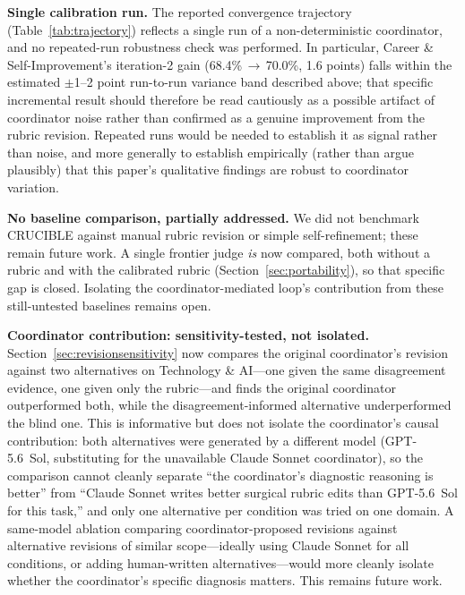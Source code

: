 \documentclass[11pt]{article}
\begin{document}
\textbf{Single calibration run.} The reported convergence trajectory
(Table~\ref{tab:trajectory}) reflects a single run of a non-deterministic
coordinator, and no repeated-run robustness check was performed. In particular, Career \& Self-Improvement's iteration-2 gain
(68.4\%\,$\to$\,70.0\%, 1.6 points) falls within the estimated $\pm$1--2 point
run-to-run variance band described above; that specific
incremental result should therefore be read cautiously as a possible
artifact of coordinator noise rather than confirmed as a genuine
improvement from the rubric revision. Repeated runs would be needed to
establish it as signal rather than noise, and more generally to establish
empirically (rather than argue plausibly) that this paper's qualitative
findings are robust to coordinator variation.

\textbf{No baseline comparison, partially addressed.} We did not benchmark
CRUCIBLE against manual rubric revision or simple self-refinement; these
remain future work. A single frontier judge \emph{is} now compared, both
without a rubric and with the calibrated rubric
(Section~\ref{sec:portability}), so that specific gap is closed. Isolating
the coordinator-mediated loop's contribution from these still-untested
baselines remains open.

\textbf{Coordinator contribution: sensitivity-tested, not isolated.}
Section~\ref{sec:revisionsensitivity} now compares the original coordinator's
revision against two alternatives on Technology \& AI---one given the same
disagreement evidence, one given only the rubric---and finds the original
coordinator outperformed both, while the disagreement-informed alternative
underperformed the blind one. This is informative but does not isolate the
coordinator's causal contribution: both alternatives were generated by a
different model (GPT-5.6~Sol, substituting for the unavailable Claude
Sonnet coordinator), so the comparison cannot cleanly separate ``the
coordinator's diagnostic reasoning is better'' from ``Claude Sonnet writes
better surgical rubric edits than GPT-5.6~Sol for this task,'' and only one
alternative per condition was tried on one domain. A same-model ablation
comparing coordinator-proposed revisions against alternative revisions of
similar scope---ideally using Claude Sonnet for all conditions, or adding
human-written alternatives---would more cleanly isolate whether the
coordinator's specific diagnosis matters. This remains future work.
\end{document}

